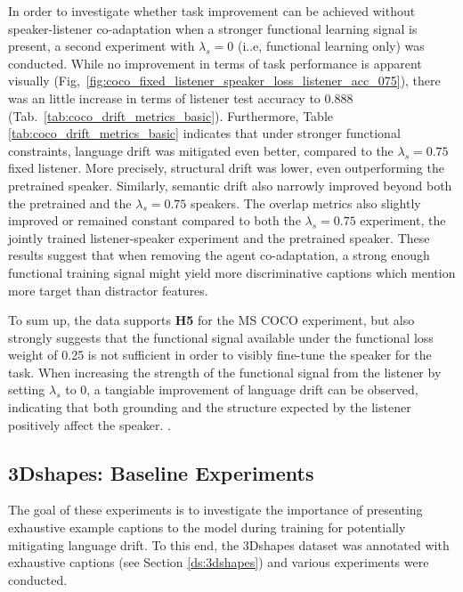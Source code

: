 In order to investigate whether task improvement can be achieved without speaker-listener co-adaptation when a stronger functional learning signal is present, a second experiment with $\lambda_s=0$ (i..e, functional learning only) was conducted. While no improvement in terms of task performance is apparent visually (Fig,~\ref{fig:coco_fixed_listener_speaker_loss_listener_acc_075}), there was an little increase in terms of listener test accuracy to 0.888 (Tab.~\ref{tab:coco_drift_metrics_basic}). Furthermore, Table \ref{tab:coco_drift_metrics_basic} indicates that under stronger functional constraints, language drift was mitigated even better, compared to the $\lambda_s = 0.75$ fixed listener. More precisely, structural drift was lower, even outperforming the pretrained speaker. Similarly, semantic drift also narrowly improved beyond both the pretrained and the $\lambda_s = 0.75$ speakers. 
The overlap metrics also slightly improved or remained constant compared to both the $\lambda_s=0.75$ experiment, the jointly trained listener-speaker experiment and the pretrained speaker. These results suggest that when removing the agent co-adaptation, a strong enough functional training signal might yield more discriminative captions which mention more target than distractor features. 

To sum up, the data supports \textbf{H5} for the MS COCO experiment, but also strongly suggests that the functional signal available under the functional loss weight of 0.25 is not sufficient in order to visibly fine-tune the speaker for the task. When increasing the strength of the functional signal from the listener by setting $\lambda_s$ to 0, a tangiable improvement of language drift can be observed, indicating that both grounding and the structure expected by the listener positively affect the speaker. .


\subsection{3Dshapes: Baseline Experiments}
\label{expt:3dshapes_baseline}

The goal of these experiments is to investigate the importance of presenting exhaustive example captions to the model during training for potentially mitigating language drift. To this end, the 3Dshapes dataset was annotated with exhaustive captions (see Section \ref{ds:3dshapes}) and various experiments were conducted. %

